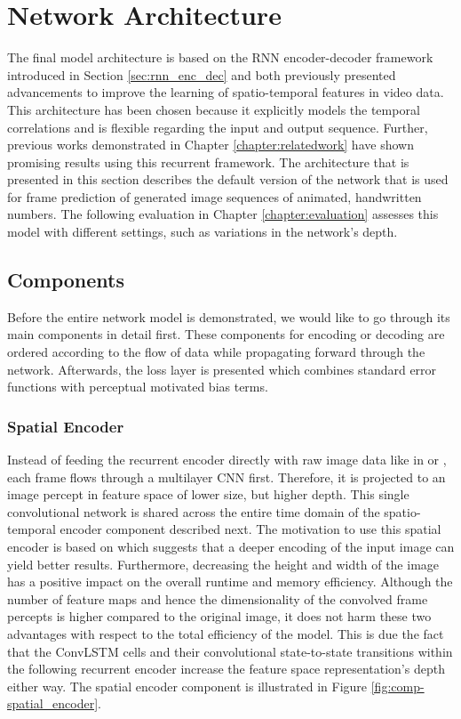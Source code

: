 \section{Network Architecture}

The final model architecture is based on the RNN encoder-decoder framework introduced in Section \ref{sec:rnn_enc_dec} and both previously presented advancements to improve the learning of spatio-temporal features in video data. This architecture has been chosen because it explicitly models the temporal correlations and is flexible regarding the input and output sequence. Further, previous works demonstrated in Chapter \ref{chapter:relatedwork} have shown promising results using this recurrent framework. The architecture that is presented in this section describes the default version of the network that is used for frame prediction of generated image sequences of animated, handwritten numbers. The following evaluation in Chapter \ref{chapter:evaluation} assesses this model with different settings, such as variations in the network's depth.

\subsection{Components}

Before the entire network model is demonstrated, we would like to go through its main components in detail first. These components for encoding or decoding are ordered according to the flow of data while propagating forward through the network. Afterwards, the loss layer is presented which combines standard error functions with perceptual motivated bias terms.

\subsubsection{Spatial Encoder}

Instead of feeding the recurrent encoder directly with raw image data like in \parencite{unsup_learn_lstm} or \parencite{conv_lstm_nowcasting}, each frame flows through a multilayer CNN first. Therefore, it is projected to an image percept in feature space of lower size, but higher depth. This single convolutional network is shared across the entire time domain of the spatio-temporal encoder component described next. The motivation to use this spatial encoder is based on \parencite{spat_temp_video_autoenc} which suggests that a deeper encoding of the input image can yield better results. Furthermore, decreasing the height and width of the image has a positive impact on the overall runtime and memory efficiency. Although the number of feature maps and hence the dimensionality of the convolved frame percepts is higher compared to the original image, it does not harm these two advantages with respect to the total efficiency of the model. This is due the fact that the ConvLSTM cells and their convolutional state-to-state transitions within the following recurrent encoder increase the feature space representation's depth either way. The spatial encoder component is illustrated in Figure \ref{fig:comp-spatial_encoder}.






